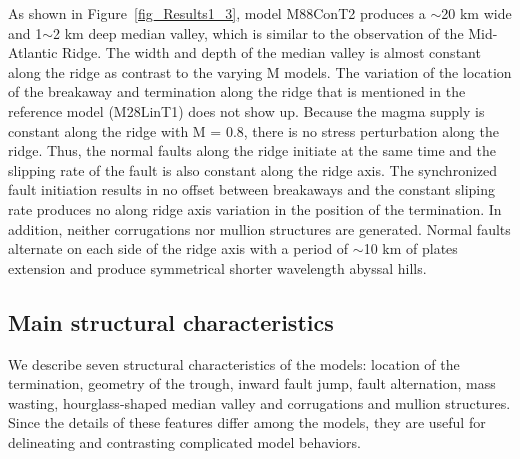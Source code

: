 \documentclass[draft,gc]{agutex}
\begin{document}
\begin{article}
As shown in Figure~\ref{fig_Results1_3}, model M88ConT2 produces a $\sim$20 km wide and 1$\sim$2 km deep median valley, which is similar to the observation of the Mid-Atlantic Ridge. The width and depth of the median valley is almost constant along the ridge as contrast to the varying M models. The variation of the location of the breakaway and termination along the ridge that is mentioned in the reference model (M28LinT1) does not show up. Because the magma supply is constant along the ridge with M = 0.8, there is no stress perturbation along the ridge. Thus, the normal faults along the ridge initiate at the same time and the slipping rate of the fault is also constant along the ridge axis. The synchronized fault initiation results in no offset between breakaways and the constant sliping rate produces no along ridge axis variation in the position of the termination. In addition, neither corrugations nor mullion structures are generated. Normal faults alternate on each side of the ridge axis with a period of $\sim$10 km of plates extension and produce symmetrical shorter wavelength abyssal hills.

\subsection{Main structural characteristics}
We describe seven structural characteristics of the models: location of the termination, geometry of the trough, inward fault jump, fault alternation, mass wasting, hourglass-shaped median valley and corrugations and mullion structures. Since the details of these features differ among the models, they are useful for delineating and contrasting complicated model behaviors.


\end{article}
\end{document}
